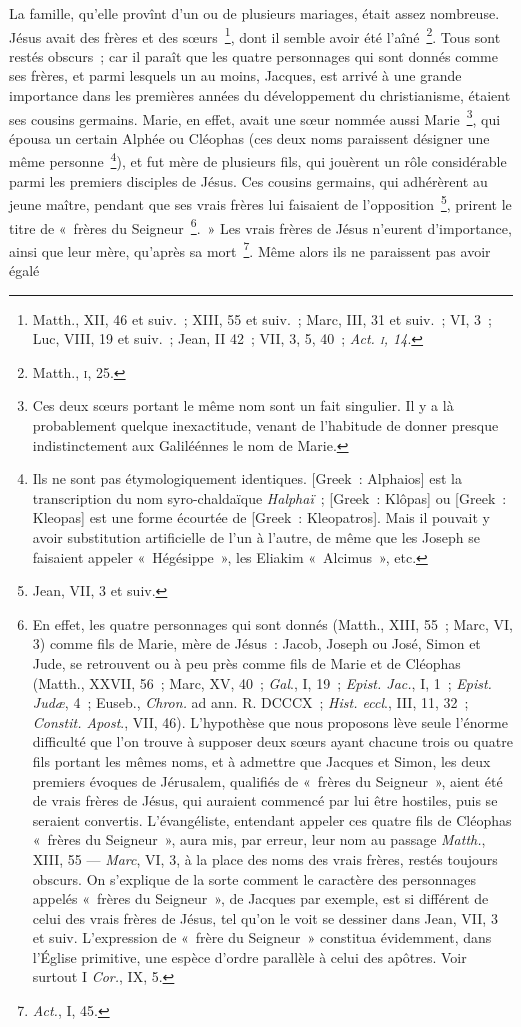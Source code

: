 \documentclass[french,twoside]{book} %
\begin{document}
La famille, qu’elle provînt d’un ou de plusieurs mariages, était assez nombreuse. Jésus avait des frères et des sœurs \footnote{ Matth., XII, 46 et suiv. ; XIII, 55 et suiv. ; Marc, III, 31 et suiv. ; VI, 3 ; Luc, VIII, 19 et suiv. ; Jean, II 42 ; VII, 3, 5, 40 ; {\itshape Act. \textsc{i}, 14}.}, dont il semble avoir été l’aîné \footnote{ Matth., \textsc{i}, 25.}. Tous sont restés obscurs ; car il paraît que les quatre personnages qui sont donnés comme ses frères, et parmi lesquels un au moins, Jacques, est arrivé à une grande importance dans les premières années du développement du christianisme, étaient ses cousins germains. Marie, en effet, avait une sœur nommée aussi Marie \footnote{Ces deux sœurs portant le même nom sont un fait singulier. Il y a là probablement quelque inexactitude, venant de l’habitude de donner presque indistinctement aux Galiléénnes le nom de Marie.}, qui épousa un certain Alphée ou Cléophas (ces deux noms paraissent désigner une même personne \footnote{ Ils ne sont pas étymologiquement identiques. [Greek : Alphaios] est la transcription du nom syro-chaldaïque {\itshape Halphaï} ; [Greek : Klôpas] ou [Greek : Kleopas] est une forme écourtée de [Greek : Kleopatros]. Mais il pouvait y avoir substitution artificielle de l’un à l’autre, de même que les Joseph se faisaient appeler « Hégésippe », les Eliakim « Alcimus », etc.}), et fut mère de plusieurs fils, qui jouèrent un rôle considérable parmi les premiers disciples de Jésus. Ces cousins germains, qui adhérèrent au jeune maître, pendant que ses vrais frères lui faisaient de l’opposition \footnote{Jean, VII, 3 et suiv.}, prirent le titre de « frères du Seigneur \footnote{ En effet, les quatre personnages qui sont donnés (Matth., XIII, 55 ; Marc, VI, 3) comme fils de Marie, mère de Jésus : Jacob, Joseph ou José, Simon et Jude, se retrouvent ou à peu près comme fils de Marie et de Cléophas (Matth., XXVII, 56 ; Marc, XV, 40 ; {\itshape Gal}., I, 19 ; {\itshape Epist. Jac.}, I, 1 ; {\itshape Epist. Judæ}, 4 ; Euseb., {\itshape Chron.} ad ann. R. DCCCX ; {\itshape Hist. eccl}., III, 11, 32 ; {\itshape Constit. Apost}., VII, 46). L’hypothèse que nous proposons lève seule l’énorme difficulté que l’on trouve à supposer deux sœurs ayant chacune trois ou quatre fils portant les mêmes noms, et à admettre que Jacques et Simon, les deux premiers évoques de Jérusalem, qualifiés de « frères du Seigneur », aient été de vrais frères de Jésus, qui auraient commencé par lui être hostiles, puis se seraient convertis. L’évangéliste, entendant appeler ces quatre fils de Cléophas « frères du Seigneur », aura mis, par erreur, leur nom au passage {\itshape Matth.}, XIII, 55 — {\itshape Marc}, VI, 3, à la place des noms des vrais frères, restés toujours obscurs. On s’explique de la sorte comment le caractère des personnages appelés « frères du Seigneur », de Jacques par exemple, est si différent de celui des vrais frères de Jésus, tel qu’on le voit se dessiner dans Jean, VII, 3 et suiv. L’expression de « frère du Seigneur » constitua évidemment, dans l’Église primitive, une espèce d’ordre parallèle à celui des apôtres. Voir surtout I {\itshape Cor.}, IX, 5.}. » Les vrais frères de Jésus n’eurent d’importance, ainsi que leur mère, qu’après sa mort \footnote{{\itshape Act.}, I, 45.}. Même alors ils ne paraissent pas avoir égalé 
\end{document}
